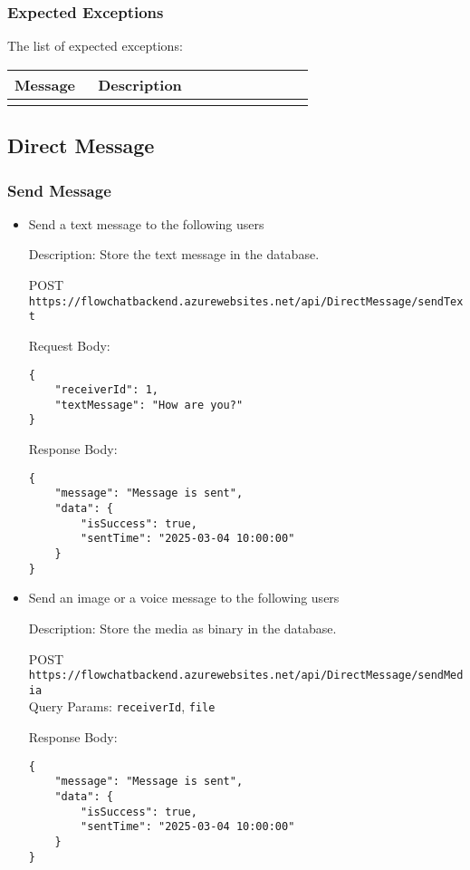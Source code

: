 \documentclass[11pt, a4paper]{article}
\begin{document}
\subsubsection{Expected Exceptions}
The list of expected exceptions: \\

\begin{tabular}{|>{\centering\arraybackslash}m{0.25\linewidth}|>{\arraybackslash}m{0.65\linewidth}|} \hline
    Message &  Description\\ \hline
     &   \\ \hline   
    
\end{tabular}

\subsection{Direct Message}
\subsubsection{Send Message}
\begin{itemize}
    \item Send a text message to the following users

    Description: Store the text message in the database.
    
    POST \texttt{https://flowchatbackend.azurewebsites.net/api/DirectMessage/sendText}  
    
    Request Body:
    \begin{lstlisting}[breaklines=true, frame=single]
{
    "receiverId": 1,
    "textMessage": "How are you?"
}
    \end{lstlisting}
    Response Body:\\
    \begin{lstlisting}[breaklines=true, frame=single]
{
    "message": "Message is sent",
    "data": {
        "isSuccess": true,
        "sentTime": "2025-03-04 10:00:00"
    }
}
    \end{lstlisting} 
    
    \item Send an image or a voice message to the following users

    Description: Store the media as binary in the database.
        
    POST \texttt{https://flowchatbackend.azurewebsites.net/api/DirectMessage/sendMedia}\\
    Query Params: \verb|receiverId|, \verb|file|
    
    Response Body:\\
    \begin{lstlisting}[breaklines=true, frame=single]
{
    "message": "Message is sent",
    "data": {
        "isSuccess": true,
        "sentTime": "2025-03-04 10:00:00"
    }
}
    \end{lstlisting}
\end{itemize}
\end{document}
